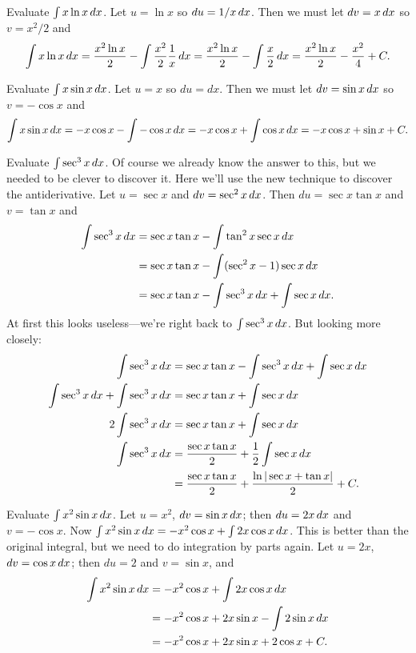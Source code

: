 \begin{example}
Evaluate $\int x\ln x\, d x$. Let $u=\ln x$ so $du=1/x\, d x$. Then
we must let $dv=x\, d x$ so $v=x^2/2$ and
$$
 \int x\ln x\, d x={x^2\ln x\over 2}-\int {x^2\over2}{1\over x}\, d x=
 {x^2\ln x\over 2}-\int {x\over2}\, d x={x^2\ln x\over 2}-{x^2\over4}+C.
$$
\end{example}

\begin{example}
Evaluate $\int x\sin x\, d x$. Let $u=x$ so $du=dx$. Then
we must let $dv=\sin x\, d x$ so $v=-\cos x$ and
$$\int x\sin x\, d x=-x\cos x-\int -\cos x\, d x=
-x\cos x+\int \cos x\, d x=-x\cos x+\sin x+C.$$
\end{example}

\begin{example}
Evaluate $\int\sec^3 x\, d x$. Of course we already know the answer
to this, but we needed to be clever to discover it. Here we'll use the
new technique to discover the antiderivative.
Let $u=\sec x$ and $dv=\sec^2 x\, d x$. Then $du=\sec x\tan x$ and
$v=\tan x$ and
\begin{align*}
  \int\sec^3 x\, d x&=\sec x\tan x-\int \tan^2x\sec x\, d x \\
  &=\sec x\tan x-\int (\sec^2x-1)\sec x\, d x \\
  &=\sec x\tan x-\int \sec^3x\, d x +\int\sec x\, d x.
\end{align*}
At first this looks useless---we're right back to
$\int\sec^3x\, d x$. But looking more closely:
\begin{align*}
  \int\sec^3x\, d x&=\sec x\tan x-\int \sec^3x\, d x +\int\sec x\, d x \\
  \int\sec^3x\, d x+\int \sec^3x\, d x&=\sec x\tan x +\int\sec x\, d x \\
  2\int\sec^3x\, d x&=\sec x\tan x +\int\sec x\, d x \\
  \int\sec^3x\, d x&={\sec x\tan x\over2} +{1\over2}\int\sec x\, d x \\
  &={\sec x\tan x\over2} +{\ln|\sec x+\tan x|\over2}+C.
\end{align*}
\end{example}

\begin{example}
Evaluate $\int x^2\sin x\, d x$. 
Let $u=x^2$, $dv=\sin x\, d x$; then $du=2x\, d x$ and $v=-\cos x$. 
Now $\int x^2\sin x\, d x=-x^2\cos x+\int 2x\cos x\, d x$. This is
better than the original integral, but we need to do integration by
parts again. Let $u=2x$, $dv=\cos x\, d x$; then
$du=2$ and $v=\sin x$, and
\begin{align*}
  \int x^2\sin x\, d x&=-x^2\cos x+\int 2x\cos x\, d x \\
  &=-x^2\cos x+ 2x\sin x - \int 2\sin x\, d x \\
  &=-x^2\cos x+ 2x\sin x + 2\cos x + C. 
\end{align*}
\end{example}

